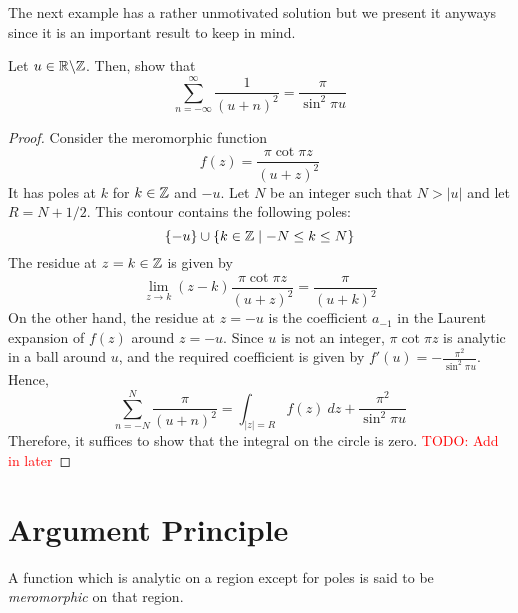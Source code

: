The next example has a rather unmotivated solution but we present it anyways since it is an important result to keep in mind.

\begin{example}
    Let $u\in\mathbb{R}\backslash\mathbb{Z}$. Then, show that 
    \begin{equation*}
        \sum_{n = -\infty}^\infty\frac{1}{(u + n)^2} = \frac{\pi}{\sin^2\pi u}
    \end{equation*}
\end{example}
\begin{proof}
    Consider the meromorphic function
    \begin{equation*}
        f(z) = \frac{\pi\cot\pi z}{(u + z)^2}
    \end{equation*}
    It has poles at $k$ for $k\in\mathbb{Z}$ and $-u$. Let $N$ be an integer such that $N > |u|$ and let $R = N + 1/2$. This contour contains the following poles: 
    \begin{equation*}
        \{-u\}\cup\{k\in\mathbb{Z}\mid -N\le k\le N\}
    \end{equation*}
    The residue at $z = k\in\mathbb{Z}$ is given by 
    \begin{equation*}
        \lim_{z\to k}(z - k)\frac{\pi\cot\pi z}{(u + z)^2} = \frac{\pi}{(u + k)^2}
    \end{equation*}
    On the other hand, the residue at $z = -u$ is the coefficient $a_{-1}$ in the Laurent expansion of $f(z)$ around $z = -u$. Since $u$ is not an integer, $\pi\cot\pi z$ is analytic in a ball around $u$, and the required coefficient is given by $f'(u) = -\frac{\pi^2}{\sin^2\pi u}$.
    Hence, 
    \begin{equation*}
        \sum_{n = -N}^N\frac{\pi}{(u + n)^2} = \int_{|z| = R}f(z)~dz + \frac{\pi^2}{\sin^2\pi u}
    \end{equation*}
    Therefore, it suffices to show that the integral on the circle is zero. \textcolor{red}{TODO: Add in later}
\end{proof}

\section{Argument Principle}

\begin{definition}[Meromorphic]
    A function which is analytic on a region except for poles is said to be \textit{meromorphic} on that region.
\end{definition}

